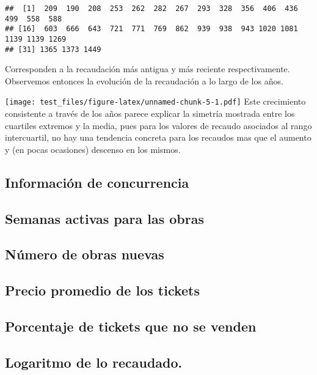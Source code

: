 \documentclass[
]{article}
\newenvironment{Shaded}{\begin{snugshade}}{\end{snugshade}}
\newcommand{\AttributeTok}[1]{\textcolor[rgb]{0.77,0.63,0.00}{#1}}
\newcommand{\FunctionTok}[1]{\textcolor[rgb]{0.00,0.00,0.00}{#1}}
\newcommand{\NormalTok}[1]{#1}
\newcommand{\SpecialCharTok}[1]{\textcolor[rgb]{0.00,0.00,0.00}{#1}}
\newcommand{\StringTok}[1]{\textcolor[rgb]{0.31,0.60,0.02}{#1}}
\begin{document}
\begin{verbatim}
##  [1]  209  190  208  253  262  282  267  293  328  356  406  436  499  558  588
## [16]  603  666  643  721  771  769  862  939  938  943 1020 1081 1139 1139 1269
## [31] 1365 1373 1449
\end{verbatim}

Corresponden a la recaudación más antigua y más reciente
respectivamente. Observemos entonces la evolución de la recaudación a lo
largo de los años.

\begin{Shaded}
\end{Shaded}

\texttt{[image: test\_files/figure-latex/unnamed-chunk-5-1.pdf]} Este
crecimiento consistente a través de los años parece explicar la simetría
mostrada entre los cuartiles extremos y la media, pues para los valores
de recaudo asociados al rango intercuartil, no hay una tendencia
concreta para los recaudos mas que el aumento y (en pocas ocasiones)
descenso en los mismos.

\hypertarget{informaciuxf3n-de-concurrencia}{%
\subsection{Información de
concurrencia}\label{informaciuxf3n-de-concurrencia}}

\hypertarget{semanas-activas-para-las-obras}{%
\subsection{Semanas activas para las
obras}\label{semanas-activas-para-las-obras}}

\hypertarget{nuxfamero-de-obras-nuevas}{%
\subsection{Número de obras nuevas}\label{nuxfamero-de-obras-nuevas}}

\hypertarget{precio-promedio-de-los-tickets}{%
\subsection{Precio promedio de los
tickets}\label{precio-promedio-de-los-tickets}}

\hypertarget{porcentaje-de-tickets-que-no-se-venden}{%
\subsection{Porcentaje de tickets que no se
venden}\label{porcentaje-de-tickets-que-no-se-venden}}

\hypertarget{logaritmo-de-lo-recaudado.}{%
\subsection{Logaritmo de lo
recaudado.}\label{logaritmo-de-lo-recaudado.}}
\end{document}
